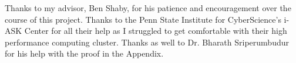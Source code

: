 Thanks to my advisor, Ben Shaby, for his patience and encouragement over the course of this project. Thanks to the Penn State Institute for CyberScience's i-ASK Center for all their help as I struggled to get comfortable with their high performance computing cluster. Thanks as well to Dr. Bharath Sriperumbudur for his help with the proof in the Appendix.